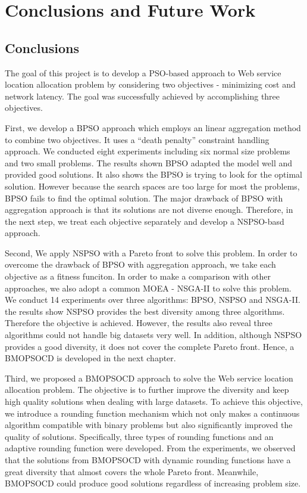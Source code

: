 \chapter{Conclusions and Future Work}\label{C:clu}
\section{Conclusions}
The goal of this project is to develop a PSO-based approach to Web service location allocation problem by considering two 
objectives - minimizing cost and network latency. The goal was successfully achieved by accomplishing three objectives.


First, we develop a BPSO approach which employs an linear aggregation method to combine two objectives. 
It uses a ``death penalty'' constraint handling approach. We conducted eight experiments including six normal size problems and two small problems.  The results shown BPSO adapted the model well and provided good solutions. It also shows the BPSO is trying to look for the optimal solution. However because the search spaces are too large for most the problems, BPSO fails
to find the optimal solution. The major drawback of BPSO with aggregation approach is that its solutions are not diverse enough. Therefore, in the next step, we treat each objective separately and develop a NSPSO-basd approach.

Second, We apply NSPSO with a Pareto front to solve this problem. In order to overcome the drawback of BPSO with aggregation approach, we take each objective as a fitness funciton.  In order to make a comparison with other approaches, we also adopt
a common MOEA - NSGA-II to solve this problem. We conduct 14 experiments over three algorithms: BPSO, NSPSO and NSGA-II.
the results show NSPSO provides the best diversity among three algorithms. Therefore the objective is achieved. However,
the results also reveal three algorithms could not handle big datasets very well. In addition, although NSPSO provides a good diversity, it does not cover the complete Pareto front. Hence, a BMOPSOCD is developed 
in the next chapter.

Third, we proposed a BMOPSOCD approach to solve the Web service location allocation problem. The objective is to further improve the diversity and keep high quality solutions when dealing with large datasets. To achieve this objective, we introduce a rounding function mechanism which
not only makes a continuous algorithm compatible with binary problems but also significantly improved the quality of solutions.
Specifically, three types of rounding functions and an adaptive rounding function were developed.
From the experiments, we observed that the solutions from BMOPSOCD with dynamic rounding functions have a great diversity that almost covers the whole Pareto front. 
Meanwhile, BMOPSOCD could produce good solutions regardless of increasing problem size.

